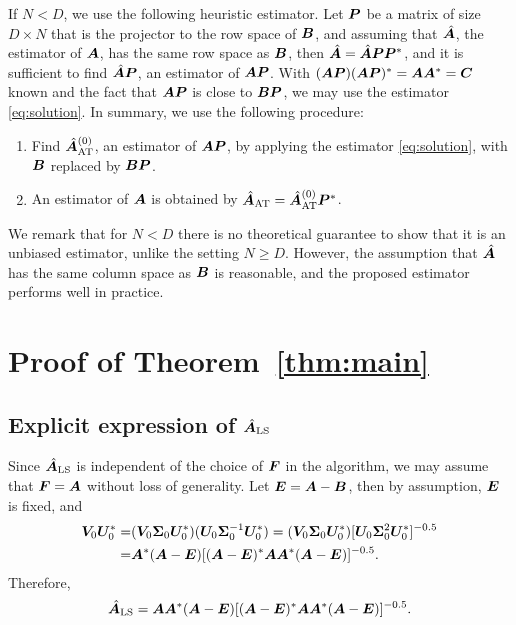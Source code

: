 If $N<D$, we use the following heuristic estimator. Let $\boldsymbol{P}$ be a matrix of 
size $D\times N$ that is the projector to the row space of $\boldsymbol{B}$, and assuming 
that $\hat{\boldsymbol{A}}$, the estimator of $\boldsymbol{A}$, has the same row space as $\boldsymbol{B}$, then 
$\hat{\boldsymbol{A}}=\hat{\boldsymbol{A}}\boldsymbol{P}\boldsymbol{P}^*$, and it is sufficient to find $\hat{\boldsymbol{A}}\boldsymbol{P}$, an 
estimator of $\boldsymbol{A}\boldsymbol{P}$. With $(\boldsymbol{A}\boldsymbol{P})(\boldsymbol{A}\boldsymbol{P})^*=\boldsymbol{A}\boldsymbol{A}^*=\boldsymbol{C}$ known and the 
fact that $\boldsymbol{A}\boldsymbol{P}$ is close to $\boldsymbol{B}\boldsymbol{P}$, we may use the estimator 
\eqref{eq:solution}. In summary, we use the following procedure:
\begin{enumerate}
\item Find $\hat{\boldsymbol{A}}^{(0)}_{\text{AT}}$, an estimator of $\boldsymbol{A}\boldsymbol{P}$, by applying 
the estimator \eqref{eq:solution}, with $\boldsymbol{B}$ replaced by $\boldsymbol{B}\boldsymbol{P}$.
\item An estimator of $\boldsymbol{A}$ is obtained by 
$\hat{\boldsymbol{A}}_{\text{AT}}=\hat{\boldsymbol{A}}^{(0)}_{\text{AT}}\boldsymbol{P}^*$.
\end{enumerate}
We remark that for $N<D$ there is no theoretical guarantee to show that it is an unbiased 
estimator, unlike the setting $N\geq D$. However, the assumption that 
$\hat{\boldsymbol{A}}$ has the same column space as $\boldsymbol{B}$ is reasonable, and the proposed 
estimator performs  well in practice.



\section{Proof of Theorem~\ref{thm:main}}
\label{sec:proof}
\subsection{Explicit expression of $\hat{\boldsymbol{A}}_{\text{LS}}$}


Since $\hat{\boldsymbol{A}}_{\text{LS}}$ is independent of the choice of $\boldsymbol{F}$ in the algorithm, we may assume that $\boldsymbol{F}=\boldsymbol{A}$ without loss of generality. Let $\boldsymbol{E}=\boldsymbol{A}-\boldsymbol{B}$, then by assumption, $\boldsymbol{E}$ is fixed, and 
\begin{align*}
\boldsymbol{V}_0\boldsymbol{U}_0^*=&(\boldsymbol{V}_0\boldsymbol\Sigma_0\boldsymbol{U}_0^*)(\boldsymbol{U}_0\boldsymbol\Sigma_0^{-1}\boldsymbol{U}_0^*)=(\boldsymbol{V}_0\boldsymbol\Sigma_0\boldsymbol{U}_0^*)[\boldsymbol{U}_0\boldsymbol\Sigma_0^{2}\boldsymbol{U}_0^*]^{-0.5}\\=&\boldsymbol{A}^*(\boldsymbol{A}-\boldsymbol{E})[(\boldsymbol{A}-\boldsymbol{E})^*\boldsymbol{A}\boldsymbol{A}^*(\boldsymbol{A}-\boldsymbol{E})]^{-0.5}.
\end{align*}
Therefore,
\begin{equation}\label{eq:hatX}
\hat{\boldsymbol{A}}_{\text{LS}}=\boldsymbol{A}\boldsymbol{A}^*(\boldsymbol{A}-\boldsymbol{E})[(\boldsymbol{A}-\boldsymbol{E})^*\boldsymbol{A}\boldsymbol{A}^*(\boldsymbol{A}-\boldsymbol{E})]^{-0.5}.
\end{equation}


